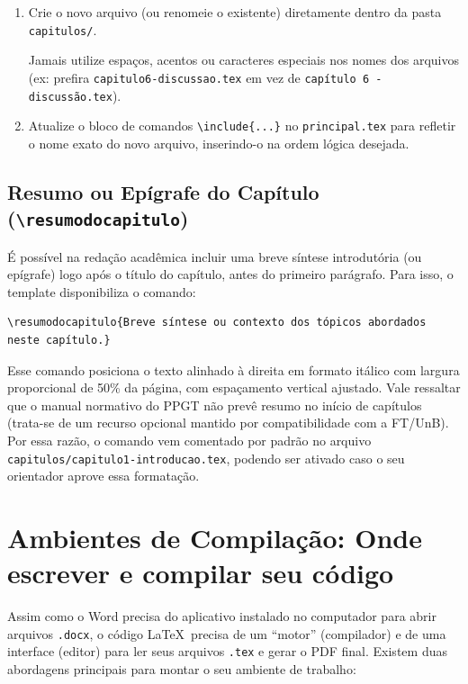 \documentclass[a4paper,12pt]{article}
\begin{document}
\begin{enumerate}
    \item Crie o novo arquivo (ou renomeie o existente) diretamente dentro da pasta \texttt{capitulos/}. 
    
    \begin{atencao}
    Jamais utilize espaços, acentos ou caracteres especiais nos nomes dos arquivos (ex: prefira \texttt{capitulo6-discussao.tex} em vez de \texttt{capítulo 6 - discussão.tex}).
    \end{atencao}
    
    \item Atualize o bloco de comandos \texttt{\textbackslash include\{...\}} no \texttt{principal.tex} para refletir o nome exato do novo arquivo, inserindo-o na ordem lógica desejada.
\end{enumerate}

\subsection{Resumo ou Epígrafe do Capítulo (\texttt{\textbackslash resumodocapitulo})}

É possível na redação acadêmica incluir uma breve síntese introdutória (ou epígrafe) logo após o título do capítulo, antes do primeiro parágrafo. Para isso, o template disponibiliza o comando:

\begin{verbatim}
\resumodocapitulo{Breve síntese ou contexto dos tópicos abordados neste capítulo.}
\end{verbatim}

Esse comando posiciona o texto alinhado à direita em formato itálico com largura proporcional de 50\% da página, com espaçamento vertical ajustado. Vale ressaltar que o manual normativo do PPGT não prevê resumo no início de capítulos (trata-se de um recurso opcional mantido por compatibilidade com a FT/UnB). Por essa razão, o comando vem comentado por padrão no arquivo \texttt{capitulos/capitulo1-introducao.tex}, podendo ser ativado caso o seu orientador aprove essa formatação.

\section{Ambientes de Compilação: Onde escrever e compilar seu código}

Assim como o Word precisa do aplicativo instalado no computador para abrir arquivos \texttt{.docx}, o código \LaTeX \ precisa de um ``motor'' (compilador) e de uma interface (editor) para ler seus arquivos \texttt{.tex} e gerar o PDF final. Existem duas abordagens principais para montar o seu ambiente de trabalho:
\end{document}

